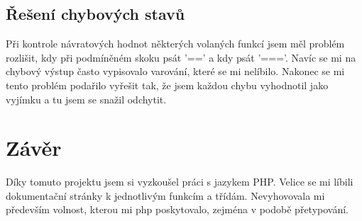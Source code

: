\documentclass[a4paper, 10pt]{article}
\begin{document}
        \subsection{Řešení chybových stavů}
            Při kontrole návratových hodnot některých volaných funkcí jsem měl
            problém rozlišit, kdy při podmíněném skoku psát '==' a kdy psát '==='.
            Navíc se mi na chybový výstup často vypisovalo varování, které se mi
            nelíbilo. Nakonec se mi tento problém podařilo vyřešit tak, že jsem
            každou chybu vyhodnotil jako vyjímku a tu jsem se snažil odchytit.
    \section{Závěr}
        Díky tomuto projektu jsem si vyzkoušel práci s jazykem PHP. Velice se mi
        líbili dokumentační stránky k jednotlivým funkcím a třídám. Nevyhovovala
        mi především volnost, kterou mi php poskytovalo, zejména v podobě
        přetypování.
\end{document}
